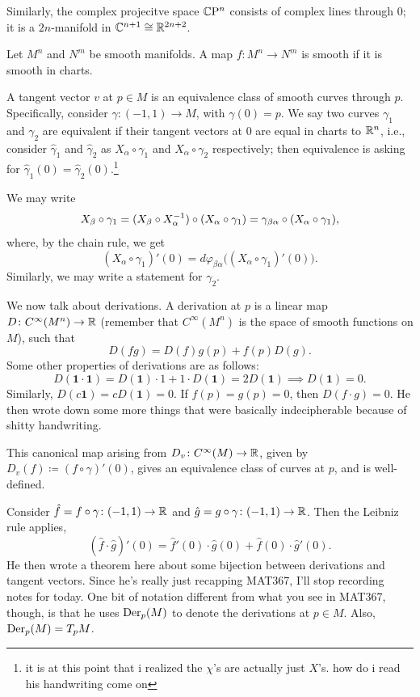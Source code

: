 Similarly, the complex projecitve space $\mathbb{C}\mathrm{P}^n$ consists of complex lines through $0$; it is a $2n$-manifold in $\mathbb C^{n+1} \cong \mathbb R^{2n+2}$.

Let $M^n$ and $N^m$ be smooth manifolds. A map $f \colon M^n \to N^m$ is smooth if it is smooth in charts.

A tangent vector $v$ at $p \in M$ is an equivalence class of smooth curves through $p$. Specifically, consider $\gamma \colon (-1, 1) \to M$, with $\gamma(0) = p$. We say two curves $\gamma_1$ and $\gamma_2$ are equivalent if their tangent vectors at $0$ are equal in charts to $\mathbb R^n$, i.e., consider $\hat \gamma_1$ and $\hat \gamma_2$ as $X_\alpha \circ \gamma_1$ and $X_\alpha \circ \gamma_2$ respectively; then equivalence is asking for $\hat \gamma_1(0) = \hat \gamma_2(0)$.\footnote{it is at this point that i realized the $\chi$'s are actually just $X$'s. how do i read his handwriting come on}

\newpage
We may write
\[ X_\beta \circ \gamma_1 = (X_\beta \circ X_\alpha^{-1}) \circ (X_\alpha \circ \gamma_1) = \gamma_{\beta \alpha} \circ (X_\alpha \circ \gamma_1), \]
where, by the chain rule, we get
\[ (X_\alpha \circ \gamma_1)' (0) = d \varphi_{\beta \alpha} \bigl((X_\alpha \circ \gamma_1)'(0)\bigr). \]
Similarly, we may write a statement for $\gamma_2$.

We now talk about derivations. A derivation at $p$ is a linear map $D \colon C^\infty(M^n) \to \mathbb R$ (remember that $C^\infty(M^n)$ is the space of smooth functions on $M$), such that
\[ D(f g) = D(f) g(p) + f(p) D(g). \]
Some other properties of derivations are as follows:
\[ D(\mathbf{1} \cdot \mathbf{1}) = D(\mathbf 1) \cdot 1 + 1 \cdot D(\mathbf 1) = 2 D(\mathbf 1) \implies D(\mathbf 1) = 0. \]
Similarly, $D(c \mathbf 1) = c D(\mathbf 1) = 0$. If $f(p) = g(p) = 0$, then $D(f \cdot g) = 0$. He then wrote down some more things that were basically indecipherable because of shitty handwriting.

\begin{exercise}
    This canonical map arising from $D_v \colon C^\infty(M) \to \mathbb R$, given by $D_v(f) \coloneq (f \circ \gamma)'(0)$, gives an equivalence class of curves at $p$, and is well-defined.
\end{exercise}

Consider $\hat f = f \circ \gamma \colon (-1, 1) \to \mathbb R$ and $\hat g = g \circ \gamma \colon (-1, 1) \to \mathbb R$. Then the Leibniz rule applies,
\[ (\hat f \cdot \hat g)'(0) = \hat f'(0) \cdot \hat g(0) + \hat f(0) \cdot \hat g'(0). \]
He then wrote a theorem here about some bijection between derivations and tangent vectors. Since he's really just recapping MAT367, I'll stop recording notes for today. One bit of notation different from what you see in MAT367, though, is that he uses $\operatorname{Der}_p(M)$ to denote the derivations at $p \in M$. Also, $\operatorname{Der}_p(M) = T_p M$.